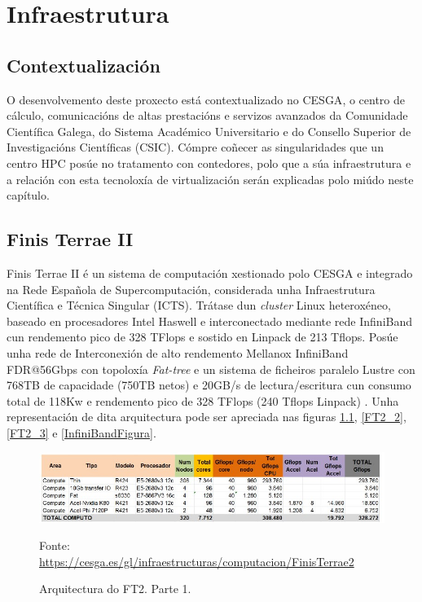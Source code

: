 \chapter{Infraestrutura}
\minitoc
\clearpage

\section{Contextualización}

O desenvolvemento deste proxecto está contextualizado no \gls{CESGA}, o centro de cálculo, comunicacións de altas prestacións e servizos avanzados da Comunidade Científica Galega, do Sistema Académico Universitario e do Consello Superior de Investigacións Científicas (CSIC). Cómpre coñecer as singularidades que un centro \gls{HPC} posúe no tratamento con contedores, polo que a súa infraestrutura e a relación con esta tecnoloxía de virtualización serán explicadas polo miúdo neste capítulo.

\section{Finis Terrae II}
\label{recursosFT2}

Finis Terrae II é un sistema de computación xestionado polo \gls{CESGA} e integrado na Rede Española de Supercomputación, considerada unha Infraestrutura Científica e Técnica Singular (ICTS). Trátase dun \textit{cluster} Linux heteroxéneo, baseado en procesadores Intel Haswell e interconectado mediante rede InfiniBand cun rendemento pico de 328 TFlops e sostido en Linpack de 213 Tflops. Posúe unha rede de Interconexión de alto rendemento Mellanox InfiniBand FDR@56Gbps con topoloxía \textit{Fat-tree} e un sistema de ficheiros paralelo Lustre con 768TB de capacidade (750TB netos) e 20GB/s de lectura/escritura cun consumo total de 118Kw e rendemento pico de 328 TFlops (240 Tflops Linpack) \cite{FT2CESGA}. Unha representación de dita arquitectura pode ser apreciada nas figuras \ref{FT2_1}, \ref{FT2_2}, \ref{FT2_3} e \ref{InfiniBandFigura}.

\begin{figure}
\centerline{\includegraphics[width=15cm]{figuras/FT2_1.jpg}}
\caption{Arquitectura do \gls{FT2}. Parte 1.}
\medskip
\small
\centerline{Fonte: \url{https://cesga.es/gl/infraestructuras/computacion/FinisTerrae2}}
\label{FT2_1}
\end{figure}

